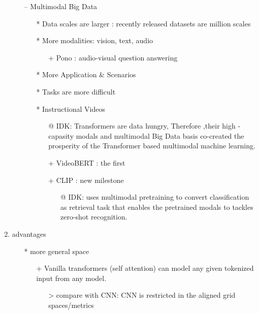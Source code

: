 \documentclass{report}
\begin{document}
\begin{enumerate}
\begin{itemize}
\begin{itemize}
\begin{itemize}
				\end{itemize}
			\end{itemize}
			\item[--] Multimodal Big Data
			\begin{itemize}
				\item[*] Data scales are larger : recently released datasets are million scales
				\item[*] More modalities: vision, text, audio
				\begin{itemize}
					\item[+] Pono : audio-visual question answering
				\end{itemize}
				\item[*] More Application \& Scenarios
				\item[*] Tasks are more difficult
				\item[*] Instructional Videos
				\begin{itemize}
					\item[@] IDK: Transformers are data hungry, Therefore ,their high -capasity modals and multimodal Big Data basis co-created the prosperity of the Transformer based multimodal machine learning. 
				\end{itemize}
				\begin{itemize}
					\item[+] VideoBERT : the first
					\item[+] CLIP : new milestone 
					\begin{itemize}
						\item[@] IDK: uses multimodal pretraining to convert classification as retrieval task that enables the pretrained modals to tackles zero-shot recognition.
					\end{itemize}
				\end{itemize}
			\end{itemize}
		\end{itemize}
		\item advantages
		\begin{itemize}
			\item[*] more general space
			\begin{itemize}
				\item[+] Vanilla transformers (self attention) can model any given tokenized input from any model.
				\begin{itemize}
					\item[>] compare with CNN: CNN is restricted in the aligned grid spaces/metrics
				\end{itemize}
			\end{itemize}
			

\end{itemize}
\end{enumerate}
\end{document}
